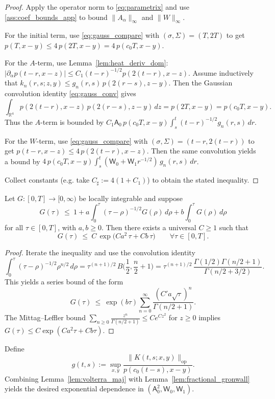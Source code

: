 \begin{proof}
Apply the operator norm to \eqref{eq:parametrix} and use \ref{ass:coef_bounds_app} to bound $\|A_\alpha\|_\infty$ and $\|W\|_\infty$.

For the initial term, use \eqref{eq:gauss_compare} with $(\sigma,\Sigma)=(T,2T)$ to get
$p(T,x-y)\le 4\,p(2T,x-y)=4\,p(c_0T,x-y)$.

For the $A$-term, use Lemma~\ref{lem:heat_deriv_dom}:
$|\partial_\alpha p(t-r,x-z)|\le C_1 (t-r)^{-1/2}p(2(t-r),x-z)$.
Assume inductively that $k_n(r,s;z,y)\le g_n(r,s)\,p(2(r-s),z-y)$.
Then the Gaussian convolution identity \eqref{eq:gauss_conv} gives
\[
\int_{\mathbb R^4} p(2(t-r),x-z)\,p(2(r-s),z-y)\,dz
= p(2T,x-y)=p(c_0T,x-y).
\]
Thus the $A$-term is bounded by
$C_1\mathsf A_0\,p(c_0T,x-y)\int_s^t (t-r)^{-1/2}g_n(r,s)\,dr$.

For the $W$-term, use \eqref{eq:gauss_compare} with $(\sigma,\Sigma)=(t-r,2(t-r))$ to get
$p(t-r,x-z)\le 4\,p(2(t-r),x-z)$.
Then the same convolution yields a bound by
$4\,p(c_0T,x-y)\int_s^t (\mathsf W_0+\mathsf W_1 r^{-1/2})\,g_n(r,s)\,dr$.

Collect constants (e.g. take $C_\sharp:=4(1+C_1)$) to obtain the stated inequality.
\end{proof}

\begin{lemma}\label{lem:fractional_gronwall}
Let $G:[0,T]\to[0,\infty)$ be locally integrable and suppose
\[
G(\tau)\ \le\ 1 + a\int_0^\tau (\tau-\rho)^{-1/2}G(\rho)\,d\rho + b\int_0^\tau G(\rho)\,d\rho
\]
for all $\tau\in[0,T]$, with $a,b\ge 0$.
Then there exists a universal $C\ge 1$ such that
\[
G(\tau)\ \le\ C\,\exp\!\big(Ca^2\,\tau + Cb\,\tau\big)\qquad \forall \tau\in[0,T].
\]
\end{lemma}

\begin{proof}
Iterate the inequality and use the convolution identity
\[
\int_0^\tau (\tau-\rho)^{-1/2}\rho^{n/2}\,d\rho = \tau^{(n+1)/2}\,B\!\Big(\frac12,\frac{n}{2}+1\Big)
= \tau^{(n+1)/2}\,\frac{\Gamma(1/2)\Gamma(n/2+1)}{\Gamma(n/2+3/2)}.
\]
This yields a series bound of the form
\[
G(\tau)\ \le\ \exp(b\tau)\sum_{n=0}^\infty \frac{(C'a\sqrt{\tau})^n}{\Gamma(n/2+1)}.
\]
The Mittag--Leffler bound $\sum_{n\ge 0}\frac{z^n}{\Gamma(n/2+1)}\le C e^{C z^2}$ for $z\ge 0$
implies $G(\tau)\le C\exp(Ca^2\tau + Cb\tau)$.
\end{proof}

Define
\[
g(t,s):=\sup_{x,y}\frac{\|K(t,s;x,y)\|_{\mathrm{op}}}{p(c_0(t-s),x-y)}.
\]
Combining Lemma~\ref{lem:volterra_maj} with Lemma~\ref{lem:fractional_gronwall} yields the desired exponential dependence in $(\mathsf A_0^2,\mathsf W_0,\mathsf W_1)$.

